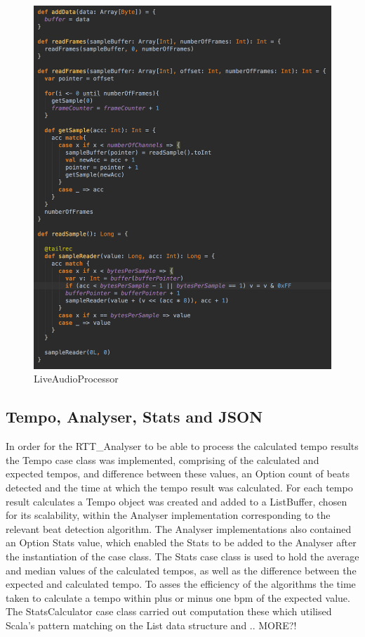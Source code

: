 \documentclass[a4paper, 11pt]{article}
\begin{document}
\begin{figure}[ht]
	\centering
	\includegraphics[scale=0.25]{images/liveAudioPro.jpg}
	\caption{LiveAudioProcessor}
	\label{fig: liveAudPro}
\end{figure}

\subsection{Tempo, Analyser, Stats and JSON}
In order for the RTT\_Analyser to be able to process the calculated tempo results the Tempo case class was implemented, comprising of the calculated and expected tempos, and difference between these values, an Option count of beats detected and the time at which the tempo result was calculated. For each tempo result calculates a Tempo object was created and added to a ListBuffer, chosen for its scalability,  within the Analyser implementation corresponding to the relevant beat detection algorithm. The Analyser implementations also contained an Option Stats value, which enabled the Stats to be added to the Analyser after the instantiation of the case class. The Stats case class is used to hold the average and median values of the calculated tempos, as well as the difference between the expected and calculated tempo. To asses the efficiency of the algorithms the time taken to calculate a tempo within plus or minus one bpm of the expected value. The StatsCalculator case class carried out computation  these which utilised Scala's pattern matching on the List data structure and .. MORE?!
\end{document}

